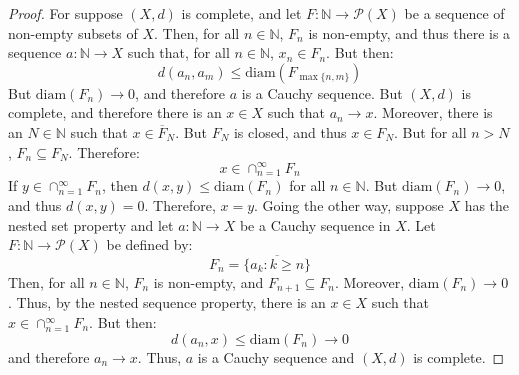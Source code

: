             \begin{proof}
                For suppose $(X,d)$ is complete, and let
                $F:\mathbb{N}\rightarrow\mathcal{P}(X)$ be a
                sequence of non-empty subsets of $X$. Then, for
                all $n\in\mathbb{N}$, $F_{n}$ is non-empty, and
                thus there is a sequence
                $a:\mathbb{N}\rightarrow{X}$ such that, for all
                $n\in\mathbb{N}$, $x_{n}\in{F_{n}}$. But then:
                \begin{equation}
                    d(a_{n},a_{m})\leq\mathrm{diam}(F_{\max\{n,m\}})
                \end{equation}
                But $\mathrm{diam}(F_{n})\rightarrow{0}$, and therefore
                $a$ is a Cauchy sequence. But $(X,d)$ is complete,
                and therefore there is an $x\in{X}$ such that
                $a_{n}\rightarrow{x}$. Moreover, there is an
                $N\in\mathbb{N}$ such that $x\in\overline{F}_{N}$.
                But $F_{N}$ is closed, and thus $x\in{F}_{N}$.
                But for all $n>N$, $F_{n}\subseteq{F}_{N}$.
                Therefore:
                \begin{equation}
                    x\in\cap_{n=1}^{\infty}F_{n}
                \end{equation}
                If $y\in\cap_{n=1}^{\infty}F_{n}$, then
                $d(x,y)\leq\mathrm{diam}(F_{n})$ for all $n\in\mathbb{N}$.
                But $\mathrm{diam}(F_{n})\rightarrow{0}$, and thus
                $d(x,y)=0$. Therefore, $x=y$. Going the other
                way, suppose $X$ has the nested set property and
                let $a:\mathbb{N}\rightarrow{X}$ be a Cauchy
                sequence in $X$. Let
                $F:\mathbb{N}\rightarrow\mathcal{P}(X)$
                be defined by:
                \begin{equation}
                    F_{n}=\overline{\{a_{k}:k\geq{n}\}}
                \end{equation}
                Then, for all $n\in\mathbb{N}$, $F_{n}$
                is non-empty, and $F_{n+1}\subseteq{F}_{n}$.
                Moreover, $\mathrm{diam}(F_{n})\rightarrow{0}$. Thus, by
                the nested sequence property, there is an
                $x\in{X}$ such that $x\in\cap_{n=1}^{\infty}F_{n}$.
                But then:
                \begin{equation}
                    d(a_{n},x)\leq\mathrm{diam}(F_{n})\rightarrow{0}
                \end{equation}
                and therefore $a_{n}\rightarrow{x}$. Thus, $a$ is
                a Cauchy sequence and $(X,d)$ is complete.
            \end{proof}

